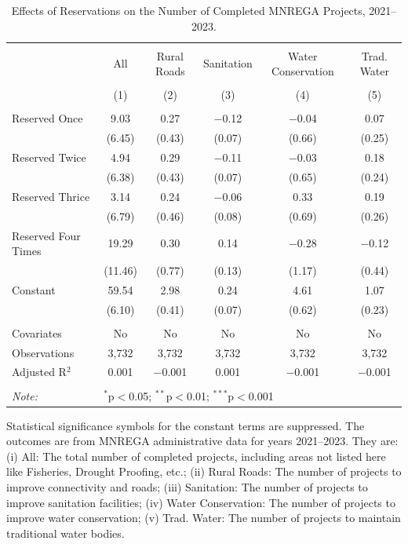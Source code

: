 \begin{table}[!htbp]
\centering
\begin{threeparttable}

  \caption{Effects of Reservations on the Number of Completed MNREGA Projects, 2021--2023.} 
  \label{main_mnrega_2011_2023_dosage} 
\scriptsize 
\begin{tabular}{@{\extracolsep{0pt}}lccccc} 
\\[-1.8ex]\hline 
\hline \\[-1.8ex] 
 & All & Rural Roads & Sanitation & Water Conservation & Trad. Water \\ 
\\[-1.8ex] & (1) & (2) & (3) & (4) & (5)\\ 
\hline \\[-1.8ex] 
 Reserved Once & 9.03 & 0.27 & $-$0.12 & $-$0.04 & 0.07 \\ 
  & (6.45) & (0.43) & (0.07) & (0.66) & (0.25) \\ 
  Reserved Twice & 4.94 & 0.29 & $-$0.11 & $-$0.03 & 0.18 \\ 
  & (6.38) & (0.43) & (0.07) & (0.65) & (0.24) \\ 
  Reserved Thrice & 3.14 & 0.24 & $-$0.06 & 0.33 & 0.19 \\ 
  & (6.79) & (0.46) & (0.08) & (0.69) & (0.26) \\ 
  Reserved Four Times & 19.29 & 0.30 & 0.14 & $-$0.28 & $-$0.12 \\ 
  & (11.46) & (0.77) & (0.13) & (1.17) & (0.44) \\ 
  Constant & 59.54 & 2.98 & 0.24 & 4.61 & 1.07 \\ 
  & (6.10) & (0.41) & (0.07) & (0.62) & (0.23) \\ 
 \hline \\[-1.8ex] 
Covariates & No & No & No & No & No \\ 
Observations & 3,732 & 3,732 & 3,732 & 3,732 & 3,732 \\ 
Adjusted R$^{2}$ & 0.001 & $-$0.001 & 0.001 & $-$0.001 & $-$0.001 \\ 
\hline 
\hline \\[-1.8ex] 
\textit{Note:}  & \multicolumn{5}{l}{$^{*}$p$<$0.05; $^{**}$p$<$0.01; $^{***}$p$<$0.001} \\ 
\end{tabular} 
\begin{tablenotes}[flushleft]
\scriptsize
\item[] Statistical significance symbols for the constant terms are suppressed. The outcomes are from MNREGA administrative data for years 2021--2023. They are: 
(i) All: The total number of completed projects, including areas not listed here like Fisheries, Drought Proofing, etc.;
(ii) Rural Roads: The number of projects to improve connectivity and roads;
(iii) Sanitation: The number of projects to improve sanitation facilities;
(iv) Water Conservation: The number of projects to improve water conservation;
(v) Trad. Water: The number of projects to maintain traditional water bodies.
\end{tablenotes}
\end{threeparttable}
\end{table}
